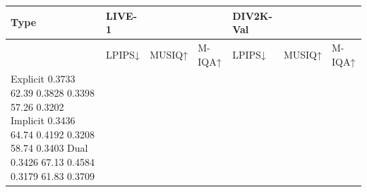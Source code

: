 \begin{tabular}{lllllll}
\toprule
Type & LIVE-1 &  &  & DIV2K-Val &  &  \\
\midrule
 & LPIPS↓ & MUSIQ↑ & M-IQA↑ & LPIPS↓ & MUSIQ↑ & M-IQA↑ \\
Explicit 0.3733 62.39 0.3828 0.3398 57.26 0.3202 Implicit 0.3436 64.74 0.4192 0.3208 58.74 0.3403 Dual 0.3426 67.13 0.4584 0.3179 61.83 0.3709 &  &  &  &  &  &  \\
\bottomrule
\end{tabular}
